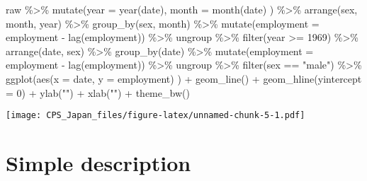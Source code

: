 \documentclass[
]{book}
\newenvironment{Shaded}{\begin{snugshade}}{\end{snugshade}}
\newcommand{\AttributeTok}[1]{\textcolor[rgb]{0.77,0.63,0.00}{#1}}
\newcommand{\DecValTok}[1]{\textcolor[rgb]{0.00,0.00,0.81}{#1}}
\newcommand{\FunctionTok}[1]{\textcolor[rgb]{0.00,0.00,0.00}{#1}}
\newcommand{\NormalTok}[1]{#1}
\newcommand{\SpecialCharTok}[1]{\textcolor[rgb]{0.00,0.00,0.00}{#1}}
\newcommand{\StringTok}[1]{\textcolor[rgb]{0.31,0.60,0.02}{#1}}
\begin{document}
\begin{Shaded}
\begin{Highlighting}[]
\NormalTok{raw }\SpecialCharTok{\%\textgreater{}\%}
  \FunctionTok{mutate}\NormalTok{(}\AttributeTok{year =} \FunctionTok{year}\NormalTok{(date),}
         \AttributeTok{month =} \FunctionTok{month}\NormalTok{(date)}
\NormalTok{         ) }\SpecialCharTok{\%\textgreater{}\%}
  \FunctionTok{arrange}\NormalTok{(sex,}
\NormalTok{          month,}
\NormalTok{          year) }\SpecialCharTok{\%\textgreater{}\%}
  \FunctionTok{group\_by}\NormalTok{(sex,}
\NormalTok{           month) }\SpecialCharTok{\%\textgreater{}\%}
  \FunctionTok{mutate}\NormalTok{(}\AttributeTok{employment =}\NormalTok{ employment }\SpecialCharTok{{-}} \FunctionTok{lag}\NormalTok{(employment)) }\SpecialCharTok{\%\textgreater{}\%}
\NormalTok{  ungroup }\SpecialCharTok{\%\textgreater{}\%}
  \FunctionTok{filter}\NormalTok{(year }\SpecialCharTok{\textgreater{}=} \DecValTok{1969}\NormalTok{) }\SpecialCharTok{\%\textgreater{}\%}
  \FunctionTok{arrange}\NormalTok{(date,}
\NormalTok{          sex) }\SpecialCharTok{\%\textgreater{}\%}
  \FunctionTok{group\_by}\NormalTok{(date) }\SpecialCharTok{\%\textgreater{}\%}
  \FunctionTok{mutate}\NormalTok{(}\AttributeTok{employment =}\NormalTok{ employment }\SpecialCharTok{{-}} \FunctionTok{lag}\NormalTok{(employment)) }\SpecialCharTok{\%\textgreater{}\%}
\NormalTok{  ungroup }\SpecialCharTok{\%\textgreater{}\%}
  \FunctionTok{filter}\NormalTok{(sex }\SpecialCharTok{==} \StringTok{"male"}\NormalTok{) }\SpecialCharTok{\%\textgreater{}\%}
  \FunctionTok{ggplot}\NormalTok{(}\FunctionTok{aes}\NormalTok{(}\AttributeTok{x =}\NormalTok{ date,}
             \AttributeTok{y =}\NormalTok{ employment)}
\NormalTok{         ) }\SpecialCharTok{+}
  \FunctionTok{geom\_line}\NormalTok{() }\SpecialCharTok{+}
  \FunctionTok{geom\_hline}\NormalTok{(}\AttributeTok{yintercept =} \DecValTok{0}\NormalTok{) }\SpecialCharTok{+}
  \FunctionTok{ylab}\NormalTok{(}\StringTok{""}\NormalTok{) }\SpecialCharTok{+}
  \FunctionTok{xlab}\NormalTok{(}\StringTok{""}\NormalTok{) }\SpecialCharTok{+}
  \FunctionTok{theme\_bw}\NormalTok{()}
\end{Highlighting}
\end{Shaded}

\texttt{[image: CPS\_Japan\_files/figure-latex/unnamed-chunk-5-1.pdf]}

\hypertarget{simple-description-1}{%
\chapter{Simple description}\label{simple-description-1}}
\end{document}
